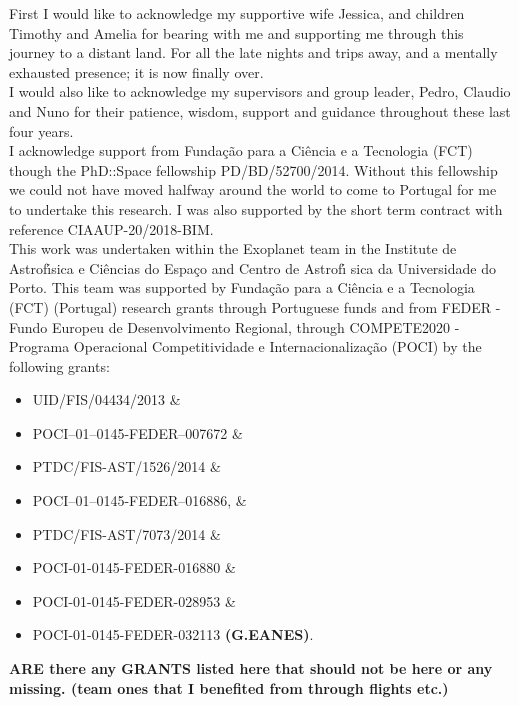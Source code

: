 \begin{acknowledgements}
First I would like to acknowledge my supportive wife Jessica, and children Timothy and Amelia for bearing with me and supporting me through this journey to a distant land.
For all the late nights and trips away, and a mentally exhausted presence; it is now finally over.\\

I would also like to acknowledge my supervisors and group leader, Pedro, Claudio and Nuno for their patience, wisdom, support and guidance throughout these last four years.\\

I acknowledge support from Funda\c{c}\~{a}o para a Ci\^encia e a Tecnologia (FCT) though the PhD::Space fellowship PD/BD/52700/2014. Without this fellowship we could not have moved halfway around the world to come to Portugal for me to undertake this research. I was also supported by the short term contract with reference CIAAUP-20/2018-BIM.\\

This work was undertaken within the Exoplanet team in the Institute de Astrof\'{\i}sica e Ci\^encias do Espa\c{c}o and  Centro de Astrof\'{\i} sica da Universidade do Porto. This team was supported by Funda\c{c}\~ao para a Ci\^{e}ncia e a Tecnologia (FCT) (Portugal) research grants through Portuguese funds and from FEDER - Fundo Europeu de Desenvolvimento Regional, through COMPETE2020 - Programa Operacional Competitividade e Internacionaliza\c{c}\~{a}o (POCI) by the following grants:
\begin{itemize}
\item[] UID/FIS/04434/2013 \&\\
\item[] POCI--01--0145-FEDER--007672 \&\\
\item[] PTDC/FIS-AST/1526/2014 \&\\
\item[] POCI--01--0145-FEDER--016886, \&\\
\item[] PTDC/FIS-AST/7073/2014 \&\\
\item[] POCI-01-0145-FEDER-016880 \&\\
\item[] POCI-01-0145-FEDER-028953 \&\\
\item[] POCI-01-0145-FEDER-032113 \textbf{(G.EANES)}. 
\end{itemize}

\textbf{ARE there any GRANTS listed here that should not be here or any missing. (team ones that I benefited from through flights etc.) }
\end{acknowledgements}
